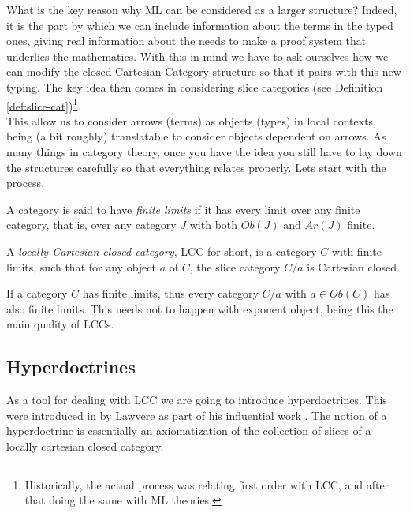 What is the key reason why ML can be considered as a larger structure? Indeed, it is the part by which we can include information about the terms in the typed ones, giving real information about the needs to make a proof system that underlies the mathematics. With this in mind we have to ask ourselves how we can modify the closed Cartesian Category structure so that it pairs with this new typing.  The key idea then comes in considering slice categories (see Definition \ref{def:slice-cat})\footnote{Historically, the actual process was relating first order with LCC, and after that doing the same with ML theories.}.\\

This allow us to consider arrows (terms) as objects (types) in local contexts, being (a bit roughly) translatable to consider objects dependent on arrows.  As many things in category theory, once you have the idea you still have to lay down the structures carefully so that everything relates properly. Lets start with the process.

\begin{definition}
  A category is said to have \emph{finite limits} if it has every limit over any finite category, that is, over any category $J$ with both $Ob(J)$ and $Ar(J)$ finite.
\end{definition}

\begin{definition}
A \emph{locally Cartesian closed category}, LCC for short,  is a category $C$ with finite limits, such that for any object $a$ of $C$, the slice category $C/a $ is Cartesian closed.
\end{definition}

\begin{remark}
  If a category $C$ has finite limits, thus every category $C/a$ with $a\in Ob(C)$  has also finite limits. This needs not to happen with exponent object, being this the main quality of LCCs.
\end{remark}

\subsection{Hyperdoctrines}


As a tool for dealing with LCC we are going to introduce hyperdoctrines. This were introduced in by Lawvere as part of his influential work \cite{lawvere1969adjointness}. The notion of a hyperdoctrine is essentially an axiomatization of the collection of slices of a locally cartesian closed category\cite{nlab:hyperdoctrine}.

